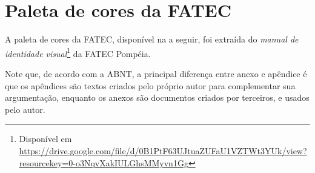 \chapter{Paleta de cores da FATEC}\label{anx:coresfatec}

A paleta de cores da FATEC, disponível na  a seguir, foi extraída do \emph{manual de identidade visual}\footnote{Disponível em \url{https://drive.google.com/file/d/0B1PtF63UJtuaZUFaU1VZTWt3YUk/view?resourcekey=0-o3NqvXakIULGhsMMyvn1Gg}} da FATEC Pompéia.

Note que, de acordo com a ABNT, a principal diferença entre anexo e apêndice é que os apêndices são textos criados pelo próprio autor para complementar sua argumentação, enquanto os anexos são documentos criados por terceiros, e usados pelo autor.

\cleardoublepage




\cleardoublepage